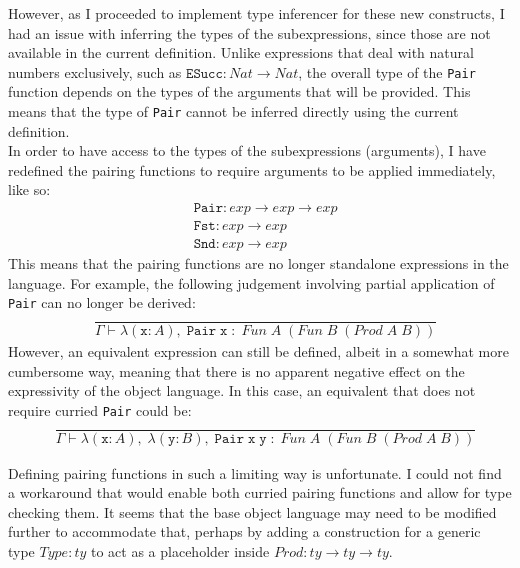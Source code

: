 \documentclass{article}
\newcommand{\tt}[1]{\texttt{#1}}
\begin{document}
However, as I proceeded to implement type inferencer for these new constructs, I had an issue with inferring the types of the subexpressions, since those are not available in the current definition. Unlike expressions that deal with natural numbers exclusively, such as ${\tt{ESucc}} : Nat \to Nat$, the overall type of the {\tt{Pair}} function depends on the types of the arguments that will be provided. This means that the type of {\tt{Pair}} cannot be inferred directly using the current definition. \\

In order to have access to the types of the subexpressions (arguments), I have redefined the pairing functions to require arguments to be applied immediately, like so:
\begin{align*}
    &{\tt{Pair}} : exp \to exp \to exp \\
    &{\tt{Fst}} : exp \to exp \\
    &{\tt{Snd}} : exp \to exp 
\end{align*}
This means that the pairing functions are no longer standalone expressions in the language. For example, the following judgement involving partial application of {\tt{Pair}} can no longer be derived:
\begin{align*}
    &\dfrac{}{\Gamma \vdash \lambda ({\tt{x}} : A), \; {\tt{Pair}} \; {\tt{x}} \; : \; Fun \; A \; (Fun \; B \; (Prod \; A \; B))}
\end{align*}
However, an equivalent expression can still be defined, albeit in a somewhat more cumbersome way, meaning that there is no apparent negative effect on the expressivity of the object language. In this case, an equivalent that does not require curried {\tt{Pair}} could be:
\begin{align*}
    &\dfrac{}{\Gamma \vdash \lambda ({\tt{x}} : A), \; \lambda ({\tt{y}} : B), \; {\tt{Pair}} \; {\tt{x}} \; {\tt{y}} \; : \; Fun \; A \; (Fun \; B \; (Prod \; A \; B))}
\end{align*}

Defining pairing functions in such a limiting way is unfortunate. I could not find a workaround that would enable both curried pairing functions and allow for type checking them. It seems that the base object language may need to be modified further to accommodate that, perhaps by adding a construction for a generic type $Type : ty$ to act as a placeholder inside $Prod : ty \to ty \to ty$.

\end{document}
